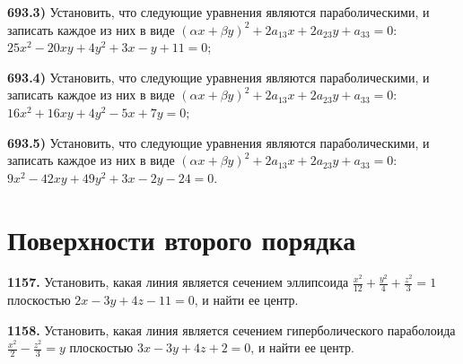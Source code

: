 \textbf{693.3)} Установить, что следующие уравнения являются параболическими, и записать каждое из них в виде $(\alpha x+\beta y)^2+2 a_{13} x+2 a_{23} y+a_{33}=0$: $25 x^2-20 x y+4 y^2+3 x-y+11=0$;

\textbf{693.4)} Установить, что следующие уравнения являются параболическими, и записать каждое из них в виде $(\alpha x+\beta y)^2+2 a_{13} x+2 a_{23} y+a_{33}=0$: $16 x^2+16 x y+4 y^2-5 x+7 y=0$;

\textbf{693.5)} Установить, что следующие уравнения являются параболическими, и записать каждое из них в виде $(\alpha x+\beta y)^2+2 a_{13} x+2 a_{23} y+a_{33}=0$: $9 x^2-42 x y+49 y^2+3 x-2 y-24=0$.



\section{Поверхности второго порядка}



\textbf{1157.} Установить, какая линия является сечением эллипсоида $\frac{x^2}{12}+\frac{y^2}{4}+\frac{z^2}{3}=1$ плоскостью $2 x-3 y+4 z-11=0$, и найти ее центр.

\textbf{1158.} Установить, какая линия является сечением гиперболического параболоида $\frac{x^2}{2}-\frac{z^2}{3}=y$ плоскостью $3 x-3 y+4 z+2=0$, и найти ее центр.